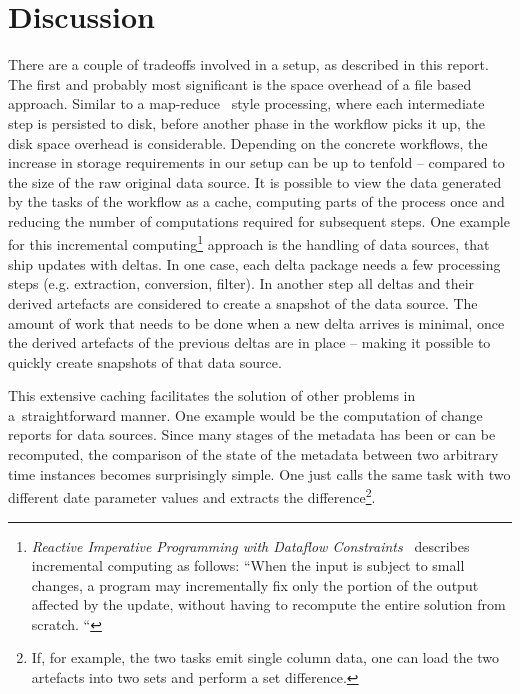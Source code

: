 \documentclass[english]{lni}
\begin{document}
\section{Discussion}
\label{discussion}

There are a couple of tradeoffs involved in a setup, as described in this
report. The first and probably most significant is the space overhead
of a file based approach. Similar to a map-reduce~\cite{dean2008mapreduce} style processing, where
each intermediate step is persisted to disk, before another phase in the
workflow picks it up, the disk space overhead is considerable. Depending
on the concrete workflows, the increase in storage requirements in our
setup can be up to tenfold -- compared to the size of the raw original data
source. It is possible to view the data generated by the tasks of the workflow
as a cache, computing parts of the process once and reducing the number
of computations required for subsequent steps. One example for this incremental
computing\footnote{\emph{Reactive Imperative Programming with Dataflow Constraints}~\cite{demetrescu2011reactive}
 describes incremental computing as follows: ``When the input is subject to small changes,
a program may incrementally fix only the portion of the output affected by the update, without having to recompute the
entire solution from scratch. ``} approach is the handling of data sources, that ship updates with deltas.
In one case, each delta package needs a few processing steps (e.g. extraction,
conversion, filter). In another step all deltas and their derived artefacts
are considered to create a snapshot of the data source. The amount of work
that needs to be done when a new delta arrives is minimal, once the derived artefacts
of the previous deltas are in place -- making it possible to quickly
create snapshots of that data source.

This extensive caching facilitates the solution of other problems in a~straightforward manner. One example would be the computation of change
reports for data sources. Since many stages of the metadata has been or
can be recomputed, the comparison of the state of the metadata between
two arbitrary time instances becomes surprisingly simple. One just calls
the same task with two different date parameter values and extracts the difference\footnote{If,
for example, the two tasks emit single column data, one can load the two artefacts
into two sets and perform a set difference.}.
\end{document}
